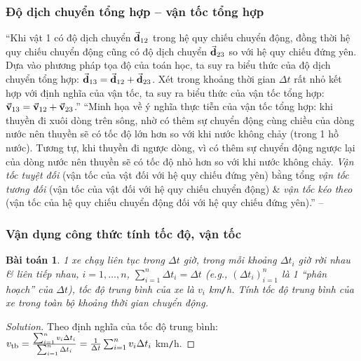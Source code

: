 \documentclass[oneside]{book}
\numberwithin{equation}{section}
\newtheorem{baitoan}{Bài toán}[section]
\begin{document}
\subsubsection{Độ dịch chuyển tổng hợp -- vận tốc tổng hợp}
``Khi vật 1 có độ dịch chuyển $\vec{\bf d}_{12}$ trong hệ quy chiếu chuyển động, đồng thời hệ quy chiếu chuyển động cũng có độ dịch chuyển $\vec{\bf d}_{23}$ so với hệ quy chiếu đứng yên. Dựa vào phương pháp tọa độ của toán học, ta suy ra biểu thức của độ dịch chuyển tổng hợp: $\vec{\bf d}_{13} = \vec{\bf d}_{12} + \vec{\bf d}_{23}$. Xét trong khoảng thời gian $\Delta t$ rất nhỏ kết hợp với định nghĩa của vận tốc, ta suy ra biểu thức của vận tốc tổng hợp: $\vec{\bf v}_{13} = \vec{\bf v}_{12} + \vec{\bf v}_{23}$.'' ``Minh họa về ý nghĩa thực tiễn của vận tốc tổng hợp: khi thuyền đi xuôi dòng trên sông, nhờ có thêm sự chuyển động cùng chiều của dòng nước nên thuyền sẽ có tốc độ lớn hơn so với khi nước không chảy (trong 1 hồ nước). Tương tự, khi thuyền đi ngược dòng, vì có thêm sự chuyển động ngược lại của dòng nước nên thuyền sẽ có tốc độ nhỏ hơn so với khi nước không chảy. \textit{Vận tốc tuyệt đối} (vận tốc của vật đối với hệ quy chiếu đứng yên) bằng tổng \textit{vận tốc tương đối} (vận tốc của vật đối với hệ quy chiếu chuyển động) \& \textit{vận tốc kéo theo} (vận tốc của hệ quy chiếu chuyển động đối với hệ quy chiếu đứng yên).'' -- \cite[p. 33]{SGK_Vat_Ly_10_Chan_Troi_Sang_Tao}

\subsubsection{Vận dụng công thức tính tốc độ, vận tốc}

\begin{baitoan}
	1 xe chạy liên tục trong $\Delta t$ giờ, trong mỗi khoảng $\Delta t_i$ giờ rời nhau \& liên tiếp nhau, $i = 1,\ldots,n$, $\sum_{i=1}^n \Delta t_i = \Delta t$ (e.g., $(\Delta t_i)_{i=1}^n$ là 1 ``phân hoạch'' của $\Delta t$), tốc độ trung bình của xe là $v_i$ km\emph{\texttt{/}}h. Tính tốc độ trung bình của xe trong toàn bộ khoảng thời gian chuyển động.
\end{baitoan}

\begin{proof}[Solution]
	Theo định nghĩa của tốc độ trung bình: $v_{\rm tb} = \frac{\sum_{i=1}^n v_i\Delta t_i}{\sum_{i=1}^n \Delta t_i} = \frac{1}{\Delta t}\sum_{i=1}^n v_i\Delta t_i$ km\texttt{/}h.
\end{proof}

\end{document}
